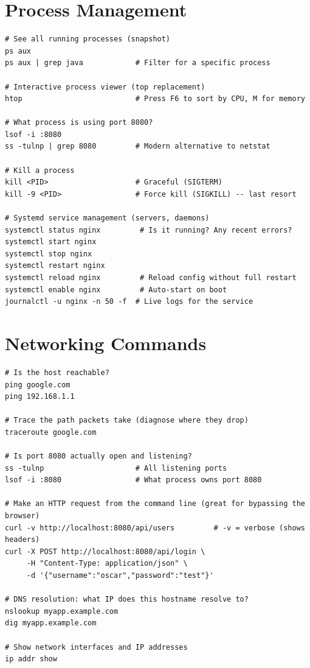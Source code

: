 \documentclass[11pt, letterpaper]{article}
\begin{document}
\section*{Process Management}

\begin{lstlisting}[style=shell, caption={Processes: finding, inspecting, and controlling}]
# See all running processes (snapshot)
ps aux
ps aux | grep java            # Filter for a specific process

# Interactive process viewer (top replacement)
htop                          # Press F6 to sort by CPU, M for memory

# What process is using port 8080?
lsof -i :8080
ss -tulnp | grep 8080         # Modern alternative to netstat

# Kill a process
kill <PID>                    # Graceful (SIGTERM)
kill -9 <PID>                 # Force kill (SIGKILL) -- last resort

# Systemd service management (servers, daemons)
systemctl status nginx         # Is it running? Any recent errors?
systemctl start nginx
systemctl stop nginx
systemctl restart nginx
systemctl reload nginx         # Reload config without full restart
systemctl enable nginx         # Auto-start on boot
journalctl -u nginx -n 50 -f  # Live logs for the service
\end{lstlisting}

\section*{Networking Commands}

\begin{lstlisting}[style=shell, caption={Network diagnostics}]
# Is the host reachable?
ping google.com
ping 192.168.1.1

# Trace the path packets take (diagnose where they drop)
traceroute google.com

# Is port 8080 actually open and listening?
ss -tulnp                     # All listening ports
lsof -i :8080                 # What process owns port 8080

# Make an HTTP request from the command line (great for bypassing the browser)
curl -v http://localhost:8080/api/users         # -v = verbose (shows headers)
curl -X POST http://localhost:8080/api/login \
     -H "Content-Type: application/json" \
     -d '{"username":"oscar","password":"test"}'

# DNS resolution: what IP does this hostname resolve to?
nslookup myapp.example.com
dig myapp.example.com

# Show network interfaces and IP addresses
ip addr show
\end{lstlisting}
\end{document}
